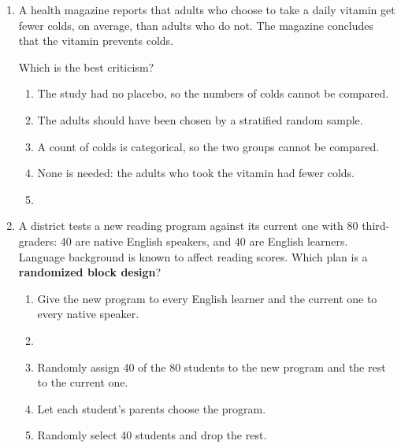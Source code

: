 \documentclass[12pt]{article}
\begin{document}
\begin{enumerate}[leftmargin=1.9em, itemsep=0.13in]
  \boxguard[14]
  \item A health magazine reports that adults who choose to take a daily vitamin get fewer
        colds, on average, than adults who do not. The magazine concludes that the vitamin
        prevents colds.

        Which is the best criticism?\hfill{}\rule[-0.2in]{0pt}{0.48in}
        \begin{enumerate}[label=\textbf{(\Alph*)}, leftmargin=2.2em, itemsep=2pt]
          \item The study had no placebo, so the numbers of colds cannot be compared.
          \item The adults should have been chosen by a stratified random sample.
          \item A count of colds is categorical, so the two groups cannot be compared.
          \item None is needed: the adults who took the vitamin had fewer colds.
          \item {}\\
        \end{enumerate}

  \boxguard[13]
  \item A district tests a new reading program against its current one with 80 third-graders:
        40 are native English speakers, and 40 are English learners. Language background is
        known to affect reading scores. Which plan is a \textbf{randomized block design}?
        \begin{enumerate}[label=\textbf{(\Alph*)}, leftmargin=2.2em, itemsep=2pt]
          \item Give the new program to every English learner and the current one to every
                native speaker.
          \item {}\\
          \item Randomly assign 40 of the 80 students to the new program and the rest to the
                current one.
          \item Let each student's parents choose the program.
          \item Randomly select 40 students and drop the rest.\hfill{}\rule[-0.2in]{0pt}{0.48in}
        \end{enumerate}


\end{enumerate}
\end{document}
